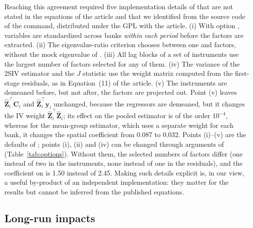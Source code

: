 \begin{table}[t!]
\centering\scriptsize

\caption{Bank data: estimates from  and from 
as published in Tables~1 and~5 of \citet{Kripfganz+Sarafidis:2025}.}
\label{tab:bank_compare}
\end{table}

Reaching this agreement required five implementation details of
 that are not stated in the equations of the article and
that we identified from the source code of the command, distributed under
the GPL with the article. (i) With option , variables are
standardized across banks \emph{within each period} before the factors are
extracted. (ii) The eigenvalue-ratio criterion chooses between one and
 factors, without the mock eigenvalue of
\citet{Ahn+Horenstein:2013}. (iii) All lag blocks of a set of instruments
use the largest number of factors selected for any of them. (iv) The
variance of the 2SIV estimator and the $J$ statistic use the weight matrix
computed from the first-stage residuals, as in Equation~(11) of the article.
(v) The instruments are demeaned before, but not after, the factors are
projected out. Point (v) leaves $\hat{\bm Z}_i^\top\bm C_i$ and
$\hat{\bm Z}_i^\top\bm y_i$ unchanged, because the regressors are demeaned,
but it changes the IV weight $\hat{\bm Z}_i^\top\hat{\bm Z}_i$; its effect on
the pooled estimator is of the order $10^{-4}$, whereas for the mean-group
estimator, which uses a separate weight for each bank, it changes the
spatial coefficient from 0.087 to 0.032. Points (i)--(v) are the defaults
of ; points (i), (ii) and (iv) can be changed through arguments
of  (Table~\ref{tab:options}). Without them, the selected numbers
of factors differ (one instead of two in the instruments, none instead of
one in the residuals), and the coefficient on  is 1.50
instead of 2.45. Making such details explicit is, in our view, a useful
by-product of an independent implementation: they matter for the results
but cannot be inferred from the published equations.

\subsection{Long-run impacts}

